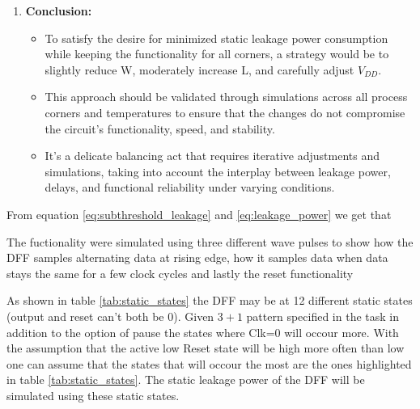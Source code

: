 \begin{enumerate}
    \item \textbf{Conclusion:}
    \begin{itemize}
        \item To satisfy the desire for minimized static leakage power consumption while keeping the functionality for all corners, a strategy would be to slightly reduce W, moderately increase L, and carefully adjust $V_{DD}$.
        \item This approach should be validated through simulations across all process corners and temperatures to ensure that the changes do not compromise the circuit's functionality, speed, and stability.
        \item It's a delicate balancing act that requires iterative adjustments and simulations, taking into account the interplay between leakage power, delays, and functional reliability under varying conditions.
    \end{itemize}
\end{enumerate}

From equation \ref{eq:subthreshold_leakage} and \ref{eq:leakage_power} we get that

The fuctionality were simulated using three different wave pulses to show how the DFF samples alternating data at rising edge, how it samples data when data stays the same for a few clock cycles and lastly the reset functionality

As shown in table \ref{tab:static_states} the DFF may be at 12 different static states (output and reset can't both be 0). Given $3+1$ pattern specified in the task in addition to the option of pause the states where Clk=0 will occour more. With the assumption that the active low Reset state will be high more often than low one can assume that the states that will occour the most are the ones highlighted in table \ref{tab:static_states}. The static leakage power of the DFF will be simulated using these static states.

